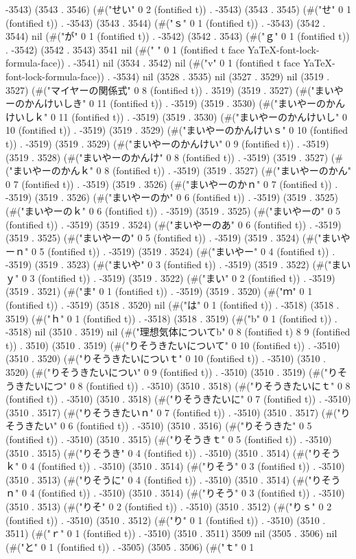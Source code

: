 -3543) (3543 . 3546) (#("せい" 0 2 (fontified t)) . -3543) (3543 . 3545) (#("せ" 0 1 (fontified t)) . -3543) (3543 . 3544) (#("ｓ" 0 1 (fontified t)) . -3543) (3542 . 3544) nil (#("が" 0 1 (fontified t)) . -3542) (3542 . 3543) (#("ｇ" 0 1 (fontified t)) . -3542) (3542 . 3543) 3541 nil (#(" " 0 1 (fontified t face YaTeX-font-lock-formula-face)) . -3541) nil (3534 . 3542) nil (#("v" 0 1 (fontified t face YaTeX-font-lock-formula-face)) . -3534) nil (3528 . 3535) nil (3527 . 3529) nil (3519 . 3527) (#("マイヤーの関係式" 0 8 (fontified t)) . 3519) (3519 . 3527) (#("まいやーのかんけいしき" 0 11 (fontified t)) . -3519) (3519 . 3530) (#("まいやーのかんけいしｋ" 0 11 (fontified t)) . -3519) (3519 . 3530) (#("まいやーのかんけいし" 0 10 (fontified t)) . -3519) (3519 . 3529) (#("まいやーのかんけいｓ" 0 10 (fontified t)) . -3519) (3519 . 3529) (#("まいやーのかんけい" 0 9 (fontified t)) . -3519) (3519 . 3528) (#("まいやーのかんけ" 0 8 (fontified t)) . -3519) (3519 . 3527) (#("まいやーのかんｋ" 0 8 (fontified t)) . -3519) (3519 . 3527) (#("まいやーのかん" 0 7 (fontified t)) . -3519) (3519 . 3526) (#("まいやーのかｎ" 0 7 (fontified t)) . -3519) (3519 . 3526) (#("まいやーのか" 0 6 (fontified t)) . -3519) (3519 . 3525) (#("まいやーのｋ" 0 6 (fontified t)) . -3519) (3519 . 3525) (#("まいやーの" 0 5 (fontified t)) . -3519) (3519 . 3524) (#("まいやーのあ" 0 6 (fontified t)) . -3519) (3519 . 3525) (#("まいやーの" 0 5 (fontified t)) . -3519) (3519 . 3524) (#("まいやーｎ" 0 5 (fontified t)) . -3519) (3519 . 3524) (#("まいやー" 0 4 (fontified t)) . -3519) (3519 . 3523) (#("まいや" 0 3 (fontified t)) . -3519) (3519 . 3522) (#("まいｙ" 0 3 (fontified t)) . -3519) (3519 . 3522) (#("まい" 0 2 (fontified t)) . -3519) (3519 . 3521) (#("ま" 0 1 (fontified t)) . -3519) (3519 . 3520) (#("ｍ" 0 1 (fontified t)) . -3519) (3518 . 3520) nil (#("は" 0 1 (fontified t)) . -3518) (3518 . 3519) (#("ｈ" 0 1 (fontified t)) . -3518) (3518 . 3519) (#("b" 0 1 (fontified t)) . -3518) nil (3510 . 3519) nil (#("理想気体についてb" 0 8 (fontified t) 8 9 (fontified t)) . 3510) (3510 . 3519) (#("りそうきたいについて" 0 10 (fontified t)) . -3510) (3510 . 3520) (#("りそうきたいについｔ" 0 10 (fontified t)) . -3510) (3510 . 3520) (#("りそうきたいについ" 0 9 (fontified t)) . -3510) (3510 . 3519) (#("りそうきたいにつ" 0 8 (fontified t)) . -3510) (3510 . 3518) (#("りそうきたいにｔ" 0 8 (fontified t)) . -3510) (3510 . 3518) (#("りそうきたいに" 0 7 (fontified t)) . -3510) (3510 . 3517) (#("りそうきたいｎ" 0 7 (fontified t)) . -3510) (3510 . 3517) (#("りそうきたい" 0 6 (fontified t)) . -3510) (3510 . 3516) (#("りそうきた" 0 5 (fontified t)) . -3510) (3510 . 3515) (#("りそうきｔ" 0 5 (fontified t)) . -3510) (3510 . 3515) (#("りそうき" 0 4 (fontified t)) . -3510) (3510 . 3514) (#("りそうｋ" 0 4 (fontified t)) . -3510) (3510 . 3514) (#("りそう" 0 3 (fontified t)) . -3510) (3510 . 3513) (#("りそうに" 0 4 (fontified t)) . -3510) (3510 . 3514) (#("りそうｎ" 0 4 (fontified t)) . -3510) (3510 . 3514) (#("りそう" 0 3 (fontified t)) . -3510) (3510 . 3513) (#("りそ" 0 2 (fontified t)) . -3510) (3510 . 3512) (#("りｓ" 0 2 (fontified t)) . -3510) (3510 . 3512) (#("り" 0 1 (fontified t)) . -3510) (3510 . 3511) (#("ｒ" 0 1 (fontified t)) . -3510) (3510 . 3511) 3509 nil (3505 . 3506) nil (#("と" 0 1 (fontified t)) . -3505) (3505 . 3506) (#("ｔ" 0 1 